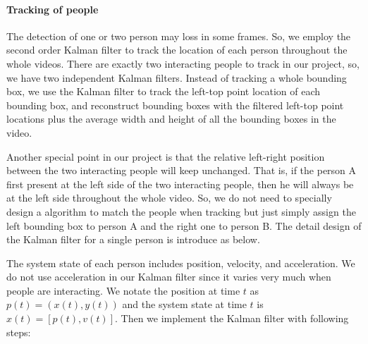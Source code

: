 \paragraph*{Tracking of people} 
The detection of one or two person may loss in some frames. So, we employ the second order Kalman filter to track the location of each person throughout the whole videos. There are exactly two interacting people to track in our project, so, we have two independent Kalman filters. Instead of tracking a whole bounding box, we use the Kalman filter to track the left-top point location of each bounding box, and reconstruct bounding boxes with the filtered left-top point locations plus the average width and height of all the bounding boxes in the video.  
\par 
Another special point in our project is that the relative left-right position between the two interacting people will keep unchanged. That is, if the person A first present at the left side of the two interacting people, then he will always be at the left side throughout the whole video.  So, we do not need to specially design a algorithm to match the people when tracking but just simply assign the left bounding box to person A and the right one to person B.  The detail design of the Kalman filter for a single person is introduce as below.
\par
The system state of each person includes position, velocity, and acceleration. We do not use acceleration in our Kalman filter since it varies very much when people are interacting. We notate the position at time \(t\) as \(p(t) = (x(t),y(t))\) and the system state at time \(t\) is \(x(t) = [p(t), v(t)]\). Then we implement the Kalman filter with following steps:
